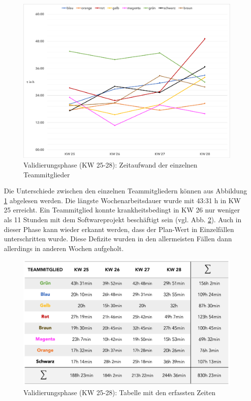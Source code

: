 \documentclass[../review_3.tex]{subfiles}
\begin{document}
\begin{figure} [h]
    \centering
    \includegraphics[width = \linewidth, trim=5pt 5pt 5pt 5pt, clip]{img/zeiten2.pdf}
    \caption{Validierungsphase (KW 25-28): Zeitaufwand der einzelnen Teammitglieder}
    \label{kimai13}
\end{figure}

Die Unterschiede zwischen den einzelnen Teammitgliedern können aus Abbildung \ref{kimai13} abgelesen werden. Die längste Wochenarbeitsdauer wurde mit 43:31 h in KW 25 erreicht. Ein Teammitglied konnte krankheitsbedingt in KW 26 nur weniger als 11 Stunden mit dem Softwareprojekt beschäftigt sein (vgl. Abb. \ref{kimai20}). Auch in dieser Phase kann wieder erkannt werden, dass der Plan-Wert in Einzelfällen unterschritten wurde. Diese Defizite wurden in den allermeisten Fällen dann allerdings in anderen Wochen aufgeholt.

\begin{figure} [h]
    \centering
    \includegraphics[width = 0.8\linewidth]{img/tabelle1.png}
    \caption{Validierungsphase (KW 25-28): Tabelle mit den erfassten Zeiten}
    \label{kimai20}
\end{figure}
\end{document}
